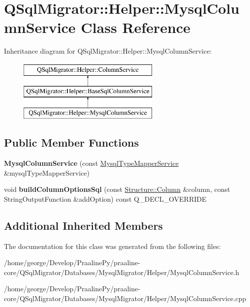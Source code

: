 \hypertarget{class_q_sql_migrator_1_1_helper_1_1_mysql_column_service}{}\section{Q\+Sql\+Migrator\+:\+:Helper\+:\+:Mysql\+Column\+Service Class Reference}
\label{class_q_sql_migrator_1_1_helper_1_1_mysql_column_service}
Inheritance diagram for Q\+Sql\+Migrator\+:\+:Helper\+:\+:Mysql\+Column\+Service\+:\begin{figure}[H]
\begin{center}
\leavevmode
\includegraphics[height=3.000000cm]{class_q_sql_migrator_1_1_helper_1_1_mysql_column_service}
\end{center}
\end{figure}
\subsection*{Public Member Functions}
\begin{DoxyCompactItemize}
\item 
\mbox{\label{class_q_sql_migrator_1_1_helper_1_1_mysql_column_service_a85f187b8f24159d6ed3bc3ba1d4263d1}} 
{\bfseries Mysql\+Column\+Service} (const \hyperlink{class_q_sql_migrator_1_1_helper_1_1_mysql_type_mapper_service}{Mysql\+Type\+Mapper\+Service} \&mysql\+Type\+Mapper\+Service)
\item 
\mbox{\label{class_q_sql_migrator_1_1_helper_1_1_mysql_column_service_a49210163c89d78d8edfd2be1cb54571a}} 
void {\bfseries build\+Column\+Options\+Sql} (const \hyperlink{class_q_sql_migrator_1_1_structure_1_1_column}{Structure\+::\+Column} \&column, const String\+Output\+Function \&add\+Option) const Q\+\_\+\+D\+E\+C\+L\+\_\+\+O\+V\+E\+R\+R\+I\+DE
\end{DoxyCompactItemize}
\subsection*{Additional Inherited Members}


The documentation for this class was generated from the following files\+:\begin{DoxyCompactItemize}
\item 
/home/george/\+Develop/\+Praaline\+Py/praaline-\/core/\+Q\+Sql\+Migrator/\+Databases/\+Mysql\+Migrator/\+Helper/Mysql\+Column\+Service.\+h\item 
/home/george/\+Develop/\+Praaline\+Py/praaline-\/core/\+Q\+Sql\+Migrator/\+Databases/\+Mysql\+Migrator/\+Helper/Mysql\+Column\+Service.\+cpp\end{DoxyCompactItemize}
